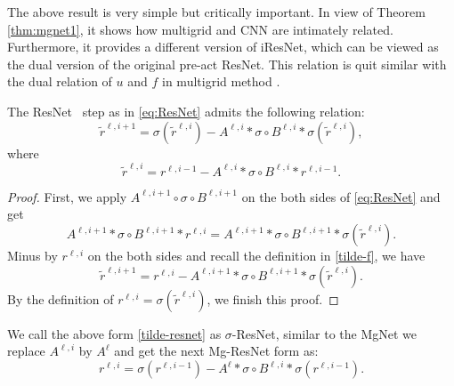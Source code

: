 The above result is very simple but critically important.
In view of Theorem \ref{thm:mgnet1}, it shows how multigrid and 
CNN are intimately related. Furthermore, it provides a different version
of iResNet, which can be viewed as the dual version of the original pre-act ResNet.
This relation is quit similar with the dual relation of $u$ and $f$
in multigrid method \cite{xu2017algebraic}.
\begin{lemma}\label{thm:mgnet2} 
	The ResNet~\cite{he2016deep} step
 	 as in \eqref{eq:ResNet} 
admits the following relation:
\begin{equation}\label{tilde-resnet}
\tilde r^{\ell,i+1} =\sigma(\tilde r^{\ell,i}) -
A^{\ell,i} \ast \sigma \circ B^{\ell,i}\ast \sigma( \tilde r^{\ell,i}),
\end{equation}
where
\begin{equation}\label{tilde-f}
\tilde r^{\ell,i} = r^{\ell, i-1} -A^{\ell,i} \ast \sigma \circ B^{\ell,i} \ast r^{\ell,i-1}.
\end{equation}
\end{lemma}
\begin{proof}
	First, we apply $ A^{\ell,i+1} \circ \sigma \circ B^{\ell,i+1}$ 
	on the both sides of \eqref{eq:ResNet} and get
	\begin{equation}\label{resnet1}
	A^{\ell,i+1} \ast \sigma \circ B^{\ell,i+1} \ast r^{\ell,i} = 
	A^{\ell,i+1} \ast \sigma \circ B^{\ell,i+1}\ast \sigma( \tilde r^{\ell,i} ).
	\end{equation}
	Minus by $r^{\ell,i}$ on the both sides and recall the definition in \eqref{tilde-f}, we have
	\begin{equation*}
	\tilde r^{\ell,i+1} = r^{\ell,i} - A^{\ell,i+1} \ast \sigma \circ B^{\ell,i+1}\ast \sigma( \tilde r^{\ell,i}).
	\end{equation*}
	By the definition of $r^{\ell,i} = \sigma(\tilde r^{\ell,i})$, we finish this proof.
\end{proof}

We call the above form \eqref{tilde-resnet} as
$\sigma$-ResNet, similar to the MgNet we replace $A^{\ell,i}$ by $A^{\ell}$  and get 
the next Mg-ResNet form as:
\begin{equation}\label{mg-resnet}
r^{\ell,i} =\sigma(r^{\ell,i-1}) -
A^{\ell} \ast \sigma \circ B^{\ell,i}\ast \sigma(r^{\ell,i-1}).
\end{equation}

